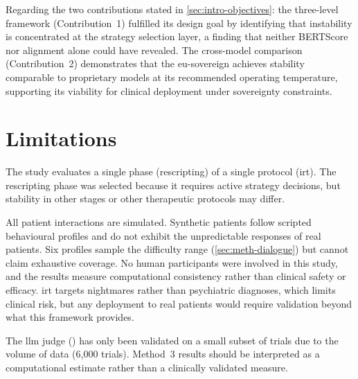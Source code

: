 Regarding the two contributions stated in \autoref{sec:intro-objectives}:
the three-level framework (Contribution~1) fulfilled its design goal by
identifying that instability is concentrated at the strategy selection
layer, a finding that neither BERTScore nor alignment alone could have
revealed. The cross-model comparison (Contribution~2) demonstrates that
the \gls{eu}-sovereign  achieves stability
comparable to proprietary models at its recommended operating temperature,
supporting its viability for clinical deployment under sovereignty
constraints.


\section{Limitations}
\label{sec:concl-limitations}

The study evaluates a single phase (rescripting) of a single protocol
(\gls{irt}). The rescripting phase was selected because it requires
active strategy decisions, but stability in other stages or other
therapeutic protocols may differ.

All patient interactions are simulated. Synthetic patients follow scripted
behavioural profiles and do not exhibit the unpredictable responses of
real patients. Six profiles sample the difficulty range
(\autoref{sec:meth-dialogue}) but cannot claim exhaustive coverage. No
human participants were involved in this study, and the results measure
computational consistency rather than clinical safety or efficacy.
\gls{irt} targets nightmares rather than psychiatric diagnoses, which
limits clinical risk, but any deployment to real patients would require
validation beyond what this framework provides.

The \gls{llm} judge () has only been validated
on a small subset of trials due to the volume of data (6{,}000 trials).
Method~3 results should be interpreted as a computational estimate rather
than a clinically validated measure.

